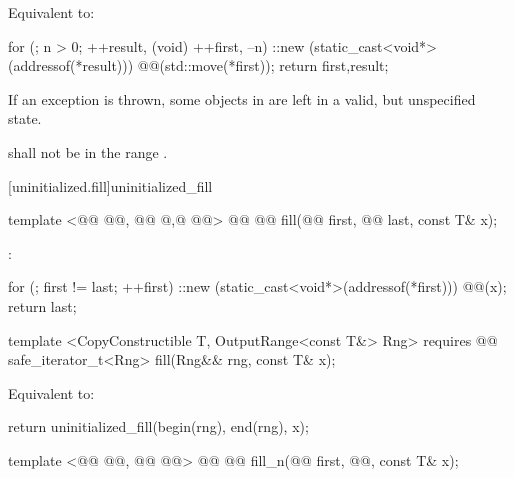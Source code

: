 \pnum
\effects Equivalent to:
\begin{codeblock}
        for (; n > 0; ++result, (void) ++first, --n)
          ::new (static_cast<void*>(addressof(*result)))
            @@(std::move(*first));
        return {first,result};
\end{codeblock}

\pnum
\remarks If an exception is thrown, some objects in \tcode{[first, next(first, n))} are left in a valid, but unspecified state.

{\color{addclr}
\pnum
\requires {} shall not be in the range \tcode{[first, next(first, n))}.
} %

[uninitialized.fill]{uninitialized_fill}
\begin{codeblock}
  template <@@ @@, @@ @,@
            @@>
    @@
    @@ fill(@@ first, @@ last, const T& x);
\end{codeblock}

\setcounter{Paras}{0}
\pnum
\effects {}:
\begin{codeblock}
        for (; first != last; ++first)
           ::new (static_cast<void*>(addressof(*first)))
              @@(x);
        return last;
\end{codeblock}
{\color{addclr}
\begin{codeblock}
  template <CopyConstructible T, OutputRange<const T&> Rng>
    requires @@
  safe_iterator_t<Rng>
    fill(Rng&& rng, const T& x);
\end{codeblock}

\pnum
\effects Equivalent to:
\begin{codeblock}
        return uninitialized_fill(begin(rng), end(rng), x);
\end{codeblock}
} %

\begin{codeblock}
  template <@@ @@, @@ @@>
    @@
  @@ fill_n(@@ first, @@, const T& x);
\end{codeblock}


